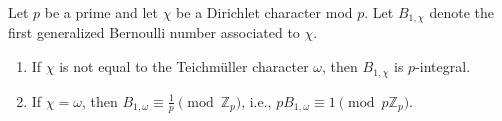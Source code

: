 Let $p$ be a prime and let $\chi$ be a Dirichlet character mod $p$. Let $B_{1,\chi}$ denote the first generalized Bernoulli number associated to $\chi$.

\begin{enumerate}
\item If $\chi$ is not equal to the Teichm\"uller character $\omega$, then $B_{1,\chi}$ is $p$-integral.
\item If $\chi = \omega$, then $B_{1,\omega} \equiv \frac{1}{p} \pmod{\mathbb{Z}_p}$, i.e., $p B_{1,\omega} \equiv 1 \pmod{p\mathbb{Z}_p}$.
\end{enumerate}
